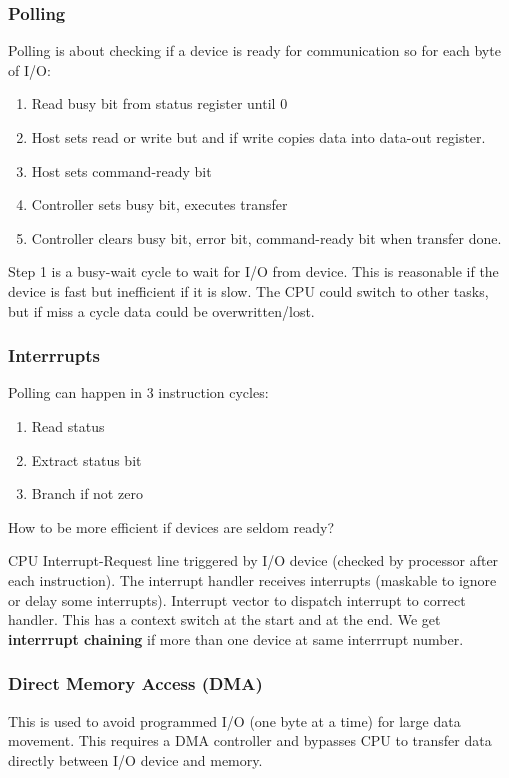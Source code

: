 \documentclass{article}%
\begin{document}
\subsubsection{Polling}
\label{sec:org0ec5291}
Polling is about checking if a device is ready for communication so for each byte of I/O:
\begin{enumerate}
\item Read busy bit from status register until 0
\item Host sets read or write but and if write copies data into data-out register.
\item Host sets command-ready bit
\item Controller sets busy bit, executes transfer
\item Controller clears busy bit, error bit, command-ready bit when transfer done.
\end{enumerate}
Step 1 is a busy-wait cycle to wait for I/O from device.
This is reasonable if the device is fast but inefficient if it is slow.
The CPU could switch to other tasks, but if miss a cycle data could be overwritten/lost.

\subsubsection{Interrrupts}
\label{sec:org57e3c12}
Polling can happen in 3 instruction cycles:
\begin{enumerate}
\item Read status
\item Extract status bit
\item Branch if not zero
\end{enumerate}
How to be more efficient if devices are seldom ready?

CPU Interrupt-Request line triggered by I/O device (checked by processor after each instruction).
The interrupt handler receives interrupts (maskable to ignore or delay some interrupts).
Interrupt vector to dispatch interrupt to correct handler.
This has a context switch at the start and at the end.
We get \textbf{interrrupt chaining} if more than one device at same interrrupt number.

\subsubsection{Direct Memory Access (DMA)}
\label{sec:org31ac013}
This is used to avoid programmed I/O (one byte at a time) for large data movement.
This requires a DMA controller and bypasses CPU to transfer data directly between I/O device and memory.
\end{document}
